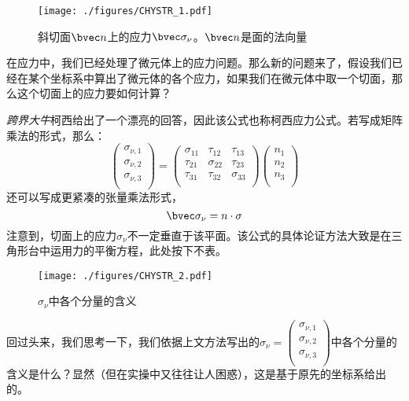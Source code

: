 

\begin{figure}[ht]
\centering
\texttt{[image: ./figures/CHYSTR\_1.pdf]}
\caption{斜切面$\bvec n$上的应力$\bvec \sigma_\nu$。$\bvec n$是面的法向量} \label{CHYSTR_fig1}
\end{figure}

在应力中，我们已经处理了微元体上的应力问题。那么新的问题来了，假设我们已经在某个坐标系中算出了微元体的各个应力，如果我们在微元体中取一个切面，那么这个切面上的应力要如何计算？

\textsl{跨界大牛}柯西给出了一个漂亮的回答，因此该公式也称柯西应力公式。若写成矩阵乘法的形式，那么：
\begin{equation}
\begin{pmatrix}
\sigma_{\nu,1}\\
\sigma_{\nu,2}\\
\sigma_{\nu,3}\\
\end{pmatrix}
=
\begin{pmatrix}
\sigma_{11} & \tau_{12} & \tau_{13} \\
\tau_{21} & \sigma_{22} & \tau_{23} \\
\tau_{31} & \tau_{32} & \sigma_{33} \\
\end{pmatrix}
\begin{pmatrix}
n_1\\
n_2\\
n_3\\
\end{pmatrix}
\end{equation}
还可以写成更紧凑的张量乘法形式，
\begin{equation}
\bvec \sigma_\nu = n \cdot \sigma
\end{equation}
注意到，切面上的应力$\sigma_\nu$不一定垂直于该平面。该公式的具体论证方法大致是在三角形台中运用力的平衡方程，此处按下不表。

\begin{figure}[ht]
\centering
\texttt{[image: ./figures/CHYSTR\_2.pdf]}
\caption{$\sigma_\nu$中各个分量的含义} \label{CHYSTR_fig2}
\end{figure}

回过头来，我们思考一下，我们依据上文方法写出的$\sigma_\nu=
\begin{pmatrix}
\sigma_{\nu,1}\\
\sigma_{\nu,2}\\
\sigma_{\nu,3}\\
\end{pmatrix}$中各个分量的含义是什么？显然（但在实操中又往往让人困惑），这是基于原先的坐标系给出的。

